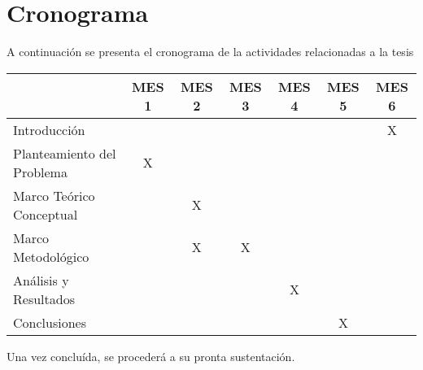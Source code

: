 \section{Cronograma}
A continuación se presenta el cronograma de la actividades relacionadas a la tesis

\begin{table}[htbp]
  \centering
    \begin{tabular}{|l|c|c|c|c|c|c|}
\cmidrule{2-7}    \multicolumn{1}{l|}{ } & MES 1 & MES 2 & MES 3 & MES 4 & MES 5 & MES 6 \\
    \midrule
    Introducción &       &       &       &       &       & X \\
    \midrule
    Planteamiento del Problema & X     &       &       &       &       &  \\
    \midrule
    Marco Teórico Conceptual &       & X     &       &       &       &  \\
    \midrule
    Marco Metodológico &       & X     & X     &       &       &  \\
    \midrule
    Análisis y Resultados &       &       &       & X     &       &  \\
    \midrule
    Conclusiones &       &       &       &       & X     &  \\
    \bottomrule
    \end{tabular}%
  \label{tab:addlabel}%

\end{table}%

Una vez concluída, se procederá a su pronta sustentación.
